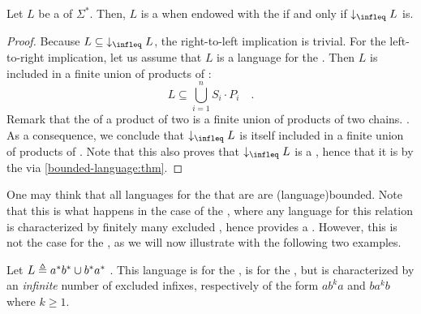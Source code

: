 \begin{corollary}
    \label{bounded-wqo-dwclosed:cor}
    Let $L$ be a  of $\Sigma^*$. Then,
    $L$ is a  when endowed with the
     if and only if $\dwset[\infleq]{L}$ is.
\end{corollary}
\begin{proof}
    Because $L \subseteq \dwset[\infleq]{L}$, the right-to-left implication
    is trivial.
    For the left-to-right implication, let us assume that $L$ is a
     language for the .
    Then $L$ is included in a finite union 
    of products of : 
    \begin{equation*}
        L \subseteq \bigcup_{i = 1}^n S_i \cdot P_i \quad .
    \end{equation*}
    Remark that the  of a product of two 
    is a finite union of products of two chains. .
    As a consequence, we conclude that $\dwset[\infleq]{L}$ is itself included
    in a finite union of products of .
    Note that this also proves that $\dwset[\infleq]{L}$ is a ,
    hence that it is  by the  
    via
    \cref{bounded-language:thm}.
\end{proof}

One may think that all  languages for the  that are  are \kl(language){bounded}. Note
that this is what happens in the case of the , where any
 language for this relation is characterized by finitely
many excluded , hence provides a  . However, this
is not the case for the , as we will now illustrate with the
following two examples.

\begin{example}
    \label{dwclosed-wqo-not-finite-excl:ex}
    Let $L \triangleq a^* b^* \cup b^* a^*$ . This language is  for the , is  for the
    , but is characterized by an \emph{infinite} number 
    of excluded infixes, respectively of the form $ab^ka$ and $ba^kb$ where $k \geq 1$.
\end{example}

